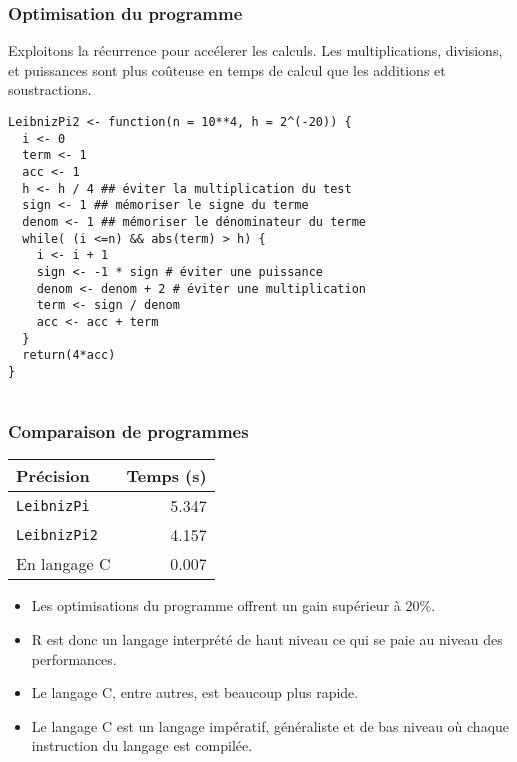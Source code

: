 \documentclass[10pt]{beamer}
\begin{document}
\begin{frame}[fragile]
  \frametitle{Optimisation du programme}
  \begin{alertblock}{Exploitons la récurrence pour accélerer les calculs.}
    \alert{Les multiplications, divisions, et puissances sont plus coûteuse en temps de calcul que les additions et soustractions.}
  \end{alertblock}

  \begin{lstlisting}
LeibnizPi2 <- function(n = 10**4, h = 2^(-20)) {
  i <- 0
  term <- 1
  acc <- 1
  h <- h / 4 ## éviter la multiplication du test
  sign <- 1 ## mémoriser le signe du terme 
  denom <- 1 ## mémoriser le dénominateur du terme
  while( (i <=n) && abs(term) > h) {
    i <- i + 1
    sign <- -1 * sign # éviter une puissance
    denom <- denom + 2 # éviter une multiplication
    term <- sign / denom
    acc <- acc + term
  }
  return(4*acc)
}
    
  \end{lstlisting}
\end{frame}

\begin{frame}
  \frametitle{Comparaison de programmes}

  
    \begin{table}[h]
    \centering
    \begin{tabular}{lr}
      \toprule
      Précision           & Temps (s) \\
      \midrule
      \texttt{LeibnizPi}  & 5.347     \\
      \texttt{LeibnizPi2} & 4.157     \\
      En langage C        & 0.007     \\
             \bottomrule
    \end{tabular}
  \end{table}

  \begin{itemize}
  \item Les optimisations du programme offrent un gain supérieur à $20\%$.
  \item R est donc un langage interprété de haut niveau ce qui se paie au niveau des performances.
  \item Le langage C, entre autres, est beaucoup plus rapide.
  \item Le langage C est un langage impératif, généraliste et de bas niveau où chaque instruction du langage est compilée.
  \end{itemize}

\end{frame}
\end{document}
